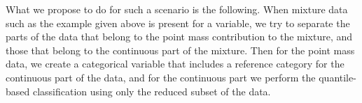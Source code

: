What we propose to do for such a scenario is the following.  When mixture data
such as the example given above is present for a variable, we try to separate
the parts of the data that belong to the point mass contribution to the mixture,
and those that belong to the continuous part of the mixture.  Then for the point
mass data, we create a categorical variable that includes a reference category
for the continuous part of the data, and for the continuous part we perform the
quantile-based classification using only the reduced subset of the data.









